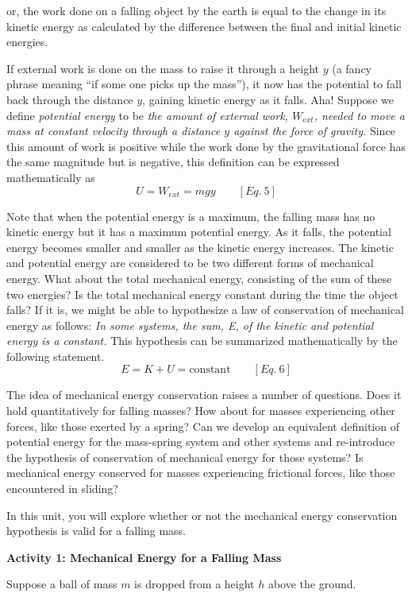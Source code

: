 or, the work done on a falling object by the earth is equal to the change in
its kinetic energy as calculated by the difference between the final and initial
kinetic energies.

If external work is done on the mass to raise it through a height $y$ (a fancy
phrase meaning ``if some one picks up the mass''), it now has
the potential to fall back through the distance $y$, gaining kinetic energy as
it falls. Aha! Suppose we define \textit{potential energy} to be \textit{the
amount of external work, \( W_{ext} \), needed to move a mass at constant velocity
through a distance $y$ against the force of gravity.} Since this amount of work
is positive while the work done by the gravitational force has the same magnitude
but is negative, this definition can be expressed mathematically as
\[
U=W_{ext}=mgy\qquad [Eq.\: 5]\]


Note that when the potential energy is a maximum, the falling mass has no kinetic
energy but it has a maximum potential energy. As it falls, the potential energy
becomes smaller and smaller as the kinetic energy increases. The kinetic and
potential energy are considered to be two different forms of mechanical energy.
What about the total mechanical energy, consisting of the sum of these two energies?
Is the total mechanical energy constant during the time the object falls? If
it is, we might be able to hypothesize a law of conservation of mechanical energy
as follows: \textit{In some systems, the sum, E, of the kinetic and potential
energy is a constant.} This hypothesis can be summarized mathematically by the
following statement.
\[
E=K+U=\mbox{constant}\qquad [Eq.\: 6]\]


The idea of mechanical energy conservation raises a number of questions. Does
it hold quantitatively for falling masses? How about for masses experiencing
other forces, like those exerted by a spring? Can we develop an equivalent definition
of potential energy for the mass-spring system and other systems and re-introduce
the hypothesis of conservation of mechanical energy for those systems? Is mechanical
energy conserved for masses experiencing frictional forces, like those encountered
in sliding?

In this unit, you will explore whether or not the mechanical energy conservation
hypothesis is valid for a falling mass.

\textbf{Activity 1: Mechanical Energy for a Falling Mass} 

Suppose a ball of mass $m$ is dropped from a height $h$ above the ground.

